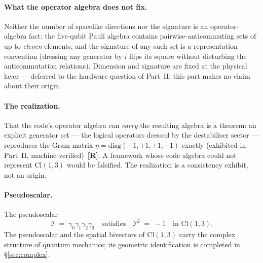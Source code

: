 \documentclass[11pt,a4paper]{article}
\newcommand{\Rmark}{\textcolor{green!50!black}{\textbf{[R]}}}
\providecommand{\Cl}[1]{\mathrm{Cl}(#1)}
\begin{document}
\paragraph{What the operator algebra does not fix.} Neither the number of spacelike directions nor the signature is an operator-algebra fact: the five-qubit Pauli algebra contains pairwise-anticommuting sets of up to \emph{eleven} elements, and the signature of any such set is a representation convention (dressing any generator by $i$ flips its square without disturbing the anticommutation relations). Dimension and signature are fixed at the physical layer --- deferred to the hardware question of Part~II; this part makes no claim about their origin.

\paragraph{The realization.} That the code's operator algebra can \emph{carry} the resulting algebra is a theorem: an explicit generator set --- the logical operators dressed by the destabiliser sector --- reproduces the Gram matrix $\eta=\mathrm{diag}(-1,+1,+1,+1)$ exactly (exhibited in Part~II, machine-verified)~\Rmark. A framework whose code algebra could not represent $\Cl{1,3}$ would be falsified. The realization is a consistency exhibit, not an origin.

\paragraph{Pseudoscalar.} The pseudoscalar
\begin{equation}
  \mathcal{I} \;=\; \gamma_0\gamma_1\gamma_2\gamma_3
  \quad\text{satisfies}\quad
  \mathcal{I}^2 \;=\; -1
  \quad\text{in } \Cl{1,3}.
  \label{eq:I_sq}
\end{equation}
The pseudoscalar and the spatial bivectors of $\Cl{1,3}$ carry the complex structure of quantum mechanics; its geometric identification is completed in \S\ref{sec:complex}.
\end{document}
